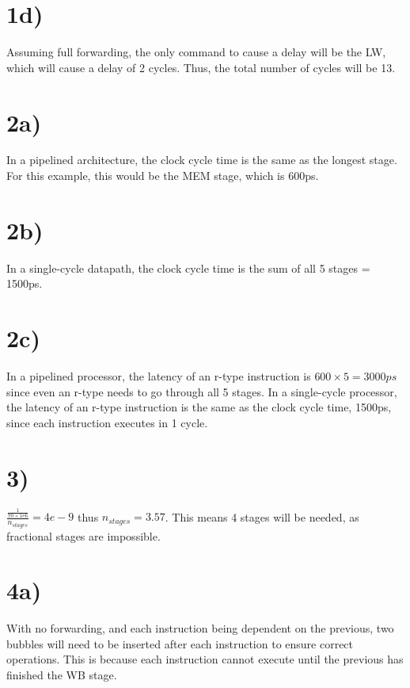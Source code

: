 \documentclass[a4paper,11pt]{article}
\begin{document}
\section*{1d)}
Assuming full forwarding, the only command to cause a delay will be the LW, which will cause a delay of 2 cycles.  Thus, the total number of cycles will be 13. 


\section*{2a)} 
In a pipelined architecture, the clock cycle time is the same as the longest stage.  For this example, this would be the MEM stage, which is
600ps.

\section*{2b)}
In a single-cycle datapath, the clock cycle time is the sum of all 5 stages = 1500ps.

\section*{2c)}
In a pipelined processor, the latency of an r-type instruction is $600 \times 5 = 3000 ps$ since even an r-type needs to go through all 5 stages.
In a single-cycle processor, the latency of an r-type instruction is the same as the clock cycle time, 1500ps, since each instruction executes in 1 cycle.


\section*{3)}
$\frac{\frac{1}{70 \times 1e6}}{n_{stages}} = 4e-9$  thus $n_{stages} = 3.57$.  This means 4 stages will be needed, as fractional stages
are impossible.  


\section*{4a)}
With no forwarding, and each instruction being dependent on the previous, two bubbles will need to be inserted after each instruction to 
ensure correct operations.  This is because each instruction cannot execute until the previous has finished the WB stage.
\end{document}
